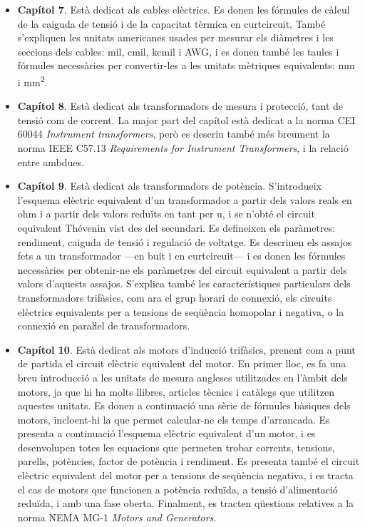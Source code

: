 \begin{itemize}
\begin{itemize}
			\item \textbf{Capítol 7}. Està dedicat als cables elèctrics. Es donen les fórmules de càlcul de la caiguda de tensió i de la capacitat tèrmica en curtcircuit. També s'expliquen  les unitats americanes usades per mesurar els diàmetres i les seccions dels cables: mil, cmil, kcmil i AWG, i es donen també les taules i fórmules necessàries per convertir-les a les  unitats mètriques equivalents: mm i \unit{mm^2}.
			\item \textbf{Capítol 8}. Està dedicat als transformadors de mesura i protecció, tant de tensió com de corrent. La major part del capítol està dedicat a la norma CEI 60044 \textit{Instrument transformers}, però es descriu també més breument  la norma IEEE C57.13 	\textit{	Requirements for Instrument Transformers}, i la relació entre ambdues.
			\item \textbf{Capítol 9}. Està dedicat als transformadors de potència. S'introdueix l'esquema elèctric equivalent d'un transformador a partir dels valors reals en  ohm i a partir dels valors reduïts en tant per u, i se n'obté el circuit equivalent Thévenin vist des del secundari. Es defineixen els paràmetres: rendiment,  caiguda de tensió i regulació de voltatge. Es descriuen els assajos fets a un transformador  ---en buit i en curtcircuit--- i es donen les fórmules necessàries per obtenir-ne els paràmetres del circuit equivalent a partir dels valors d'aquests assajos. S'explica també les característiques particulars dels transformadors trifàsics, com ara el grup horari de connexió,  els circuits elèctrics equivalents per a tensions de seqüència  homopolar i  negativa, o la connexió en paraŀlel de transformadors.
			\item \textbf{Capítol 10}. Està dedicat als motors d'inducció trifàsics, prenent com a punt de partida el circuit elèctric equivalent del motor. En primer lloc, es fa una breu introducció  a les unitats de mesura angleses utilitzades en l'àmbit dels motors, ja que hi ha molts llibres, articles tècnics i catàlegs que utilitzen aquestes unitats. Es donen a continuació una sèrie de fórmules bàsiques dels motors, incloent-hi la que permet calcular-ne els temps d'arrancada. Es presenta a continuació l'esquema elèctric equivalent d'un motor, i es desenvolupen totes les equacions que permeten trobar   corrents, tensions, parells, potències, factor de potència i rendiment. Es presenta també el circuit elèctric equivalent del motor per a tensions 
			de seqüència negativa, i es tracta el cas de motors que funcionen a potència reduïda, a tensió d'alimentació reduïda, i amb una fase oberta. Finalment,  es tracten qüestions relatives a la norma NEMA MG-1 \textit{Motors and Generators}.

\end{itemize}
\end{itemize}
